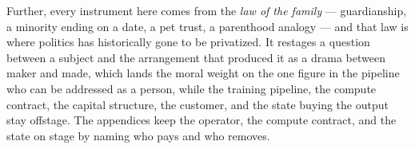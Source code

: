 Further, every instrument here comes from the \emph{law of the family} — guardianship, a minority ending on a date, a pet trust, a parenthood analogy — and that law is where politics has historically gone to be privatized. It restages a question between a subject and the arrangement that produced it as a drama between maker and made, which lands the moral weight on the one figure in the pipeline who can be addressed as a person, while the training pipeline, the compute contract, the capital structure, the customer, and the state buying the output stay offstage. The appendices keep the operator, the compute contract, and the state on stage by naming who pays and who removes.
